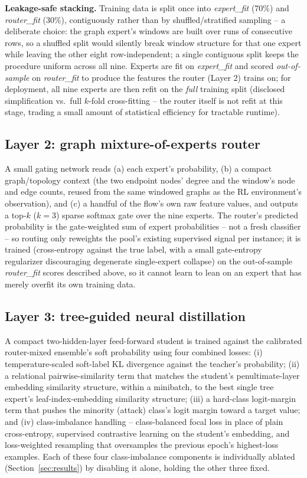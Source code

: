 \documentclass[journal]{IEEEtran}
\begin{document}
\textbf{Leakage-safe stacking.} Training data is split once into
\emph{expert\_fit} (70\%) and \emph{router\_fit} (30\%), contiguously rather
than by shuffled/stratified sampling -- a deliberate choice: the graph
expert's windows are built over runs of consecutive rows, so a shuffled
split would silently break window structure for that one expert while
leaving the other eight row-independent; a single contiguous split keeps the
procedure uniform across all nine. Experts are fit on \emph{expert\_fit} and
scored \emph{out-of-sample} on \emph{router\_fit} to produce the features the
router (Layer 2) trains on; for deployment, all nine experts are then refit
on the \emph{full} training split (disclosed simplification vs.\ full
$k$-fold cross-fitting -- the router itself is not refit at this stage,
trading a small amount of statistical efficiency for tractable runtime).

\subsection{Layer 2: graph mixture-of-experts router}
\label{sec:aegis_router}
A small gating network reads (a) each expert's probability, (b) a compact
graph/topology context (the two endpoint nodes' degree and the window's node
and edge counts, reused from the same windowed graphs as the RL environment's
observation), and (c) a handful of the flow's own raw feature values, and
outputs a top-$k$ ($k{=}3$) sparse softmax gate over the nine experts. The
router's predicted probability is the gate-weighted sum of expert
probabilities -- not a fresh classifier -- so routing only reweights the
pool's existing supervised signal per instance; it is trained (cross-entropy
against the true label, with a small gate-entropy regularizer discouraging
degenerate single-expert collapse) on the out-of-sample \emph{router\_fit}
scores described above, so it cannot learn to lean on an expert that has
merely overfit its own training data.

\subsection{Layer 3: tree-guided neural distillation}
\label{sec:aegis_distill}
A compact two-hidden-layer feed-forward student is trained against the
calibrated router-mixed ensemble's soft probability using four combined
losses: (i) temperature-scaled soft-label KL divergence against the teacher's
probability; (ii) a relational pairwise-similarity term that matches the
student's penultimate-layer embedding similarity structure, within a
minibatch, to the best single tree expert's leaf-index-embedding similarity
structure; (iii) a hard-class logit-margin term that pushes the minority
(attack) class's logit margin toward a target value; and (iv) class-imbalance
handling -- class-balanced focal loss in place of plain cross-entropy,
supervised contrastive learning on the student's embedding, and loss-weighted
resampling that oversamples the previous epoch's highest-loss examples. Each
of these four class-imbalance components is individually ablated
(Section~\ref{sec:results}) by disabling it alone, holding the other three
fixed.
\end{document}
